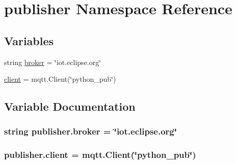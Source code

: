 \hypertarget{namespacepublisher}{}\section{publisher Namespace Reference}
\label{namespacepublisher}
\subsection*{Variables}
\begin{DoxyCompactItemize}
\item 
string \hyperlink{namespacepublisher_a5a81478dc61c38b6b361de3f645df5a9}{broker} = \char`\"{}iot.\+eclipse.\+org\char`\"{}
\item 
\hyperlink{namespacepublisher_a0662dc05382e563e2bb114b9938e4710}{client} = mqtt.\+Client(\char`\"{}python\+\_\+pub\char`\"{})
\end{DoxyCompactItemize}


\subsection{Variable Documentation}
\subsubsection[{\texorpdfstring{broker}{broker}}]{\setlength{\rightskip}{0pt plus 5cm}string publisher.\+broker = \char`\"{}iot.\+eclipse.\+org\char`\"{}}\hypertarget{namespacepublisher_a5a81478dc61c38b6b361de3f645df5a9}{}\label{namespacepublisher_a5a81478dc61c38b6b361de3f645df5a9}
\subsubsection[{\texorpdfstring{client}{client}}]{\setlength{\rightskip}{0pt plus 5cm}publisher.\+client = mqtt.\+Client(\char`\"{}python\+\_\+pub\char`\"{})}\hypertarget{namespacepublisher_a0662dc05382e563e2bb114b9938e4710}{}\label{namespacepublisher_a0662dc05382e563e2bb114b9938e4710}
